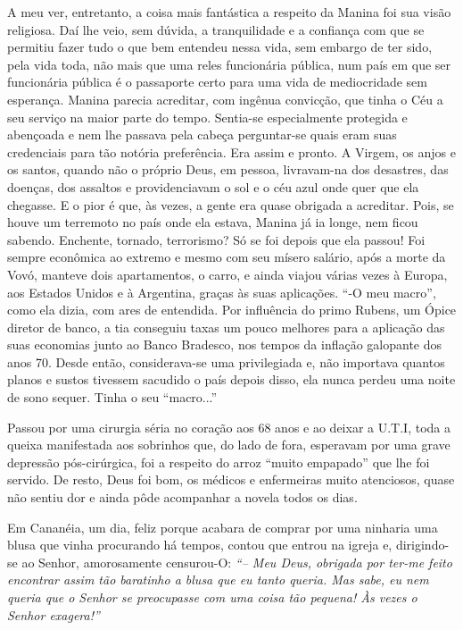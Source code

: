 A meu ver, entretanto, a coisa mais fantástica a respeito da Manina foi sua visão religiosa.
Daí lhe veio, sem dúvida, a tranquilidade e a confiança com que se permitiu fazer tudo o que bem entendeu nessa vida, sem embargo de ter sido, pela vida toda, não mais que uma reles funcionária pública, num país em que ser funcionária pública é o passaporte certo para uma vida de mediocridade sem esperança.
Manina parecia acreditar, com ingênua convicção, que tinha o Céu a seu serviço na maior parte do tempo.
Sentia-se especialmente protegida e abençoada e nem lhe passava pela cabeça perguntar-se quais eram suas credenciais para tão notória preferência.
Era assim e pronto.
A Virgem, os anjos e os santos, quando não o próprio Deus, em pessoa, livravam-na dos desastres, das doenças, dos assaltos e providenciavam o sol e o céu azul onde quer que ela chegasse.
E o pior é que, às vezes, a gente era quase obrigada a acreditar.
Pois, se houve um terremoto no país onde ela estava, Manina já ia longe, nem ficou sabendo.
Enchente, tornado, terrorismo? Só se foi depois que ela passou! Foi sempre econômica ao extremo e mesmo com seu mísero salário, após a morte da Vovó, manteve dois apartamentos, o carro, e ainda viajou várias vezes à Europa, aos Estados Unidos e à Argentina, graças às suas aplicações.
“-O meu macro”, como ela dizia, com ares de entendida.
Por influência do primo Rubens, um Ópice diretor de banco, a tia conseguiu taxas um pouco melhores para a aplicação das suas economias junto ao Banco Bradesco, nos tempos da inflação galopante dos anos 70.
Desde então, considerava-se uma privilegiada e, não importava quantos planos e sustos tivessem sacudido o país depois disso, ela nunca perdeu uma noite de sono sequer.
Tinha o seu “macro...”

Passou por uma cirurgia séria no coração aos 68 anos e ao deixar a U.T.I, toda a queixa manifestada aos sobrinhos que, do lado de fora, esperavam por uma grave depressão pós-cirúrgica, foi a respeito do arroz “muito empapado” que lhe foi servido.
De resto, Deus foi bom, os médicos e enfermeiras muito atenciosos, quase não sentiu dor e ainda pôde acompanhar a novela todos os dias.

Em Cananéia, um dia, feliz porque acabara de comprar por uma ninharia uma blusa que vinha procurando há tempos, contou que entrou na igreja e, dirigindo-se ao Senhor, amorosamente censurou-O: 
{\itshape``-- Meu Deus, obrigada por ter-me feito encontrar assim tão baratinho a blusa que eu tanto queria.
Mas sabe, eu nem queria que o Senhor se preocupasse com uma coisa tão pequena! Às vezes o Senhor exagera!''}

